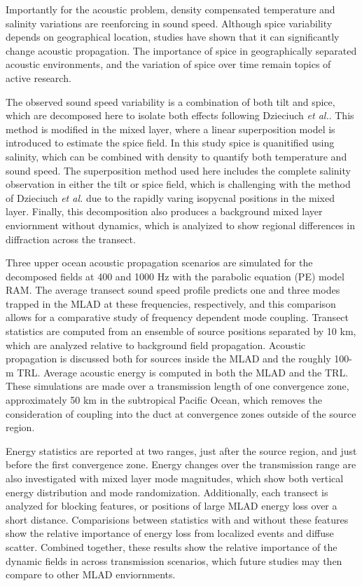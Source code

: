 \documentclass[preprint,NumberedRefs]{JASA}
\begin{document}
Importantly for the acoustic problem, density compensated temperature and salinity variations are reenforcing in sound speed. Although spice variability depends on geographical location, studies have shown that it can significantly change acoustic propagation\citep{colosi12,colosi13,murat2021}. The importance of spice in geographically separated acoustic environments, and the variation of spice over time remain topics of active research.

The observed sound speed variability is a combination of both tilt and spice, which are decomposed here to isolate both effects following Dzieciuch \emph{et al.}\citep{dzieciuch2004}. This method is modified in the mixed layer, where a linear superposition model is introduced to estimate the spice field. In this study spice is quanitified using salinity, which can be combined with density to quantify both temperature and sound speed. The superposition method used here includes the complete salinity observation in either the tilt or spice field, which is challenging with the method of Dzieciuch \emph{et al.}\cite{dzieciuch2004} due to the rapidly varing isopycnal positions in the mixed layer. Finally, this decomposition also produces a background mixed layer enviornment without dynamics, which is analyized to show regional differences in diffraction across the transect.

Three upper ocean acoustic propagation scenarios are simulated for the decomposed fields at 400 and 1000 Hz with the parabolic equation (PE) model RAM\cite{collins93}. The average transect sound speed profile predicts one and three modes trapped in the MLAD at these frequencies, respectively, and this comparison allows for a comparative study of frequency dependent mode coupling. Transect statistics are computed from an ensemble of source positions separated by 10 km, which are analyzed relative to background field propagation. Acoustic propagation is discussed both for sources inside the MLAD and the roughly 100-m TRL. Average acoustic energy is computed in both the MLAD and the TRL. These simulations are made over a transmission length of one convergence zone\citep{jensen2011computational}, approximately 50 km in the subtropical Pacific Ocean, which removes the consideration of coupling into the duct at convergence zones outside of the source region\citep{colosi2020observations}.

Energy statistics are reported at two ranges, just after the source region, and just before the first convergence zone. Energy changes over the transmission range are also investigated with mixed layer mode magnitudes, which show both vertical energy distribution and mode randomization. Additionally, each transect is analyzed for blocking features\citep{colosi2020observations}, or positions of large MLAD energy loss over a short distance. Comparisions between statistics with and without these features show the relative importance of energy loss from localized events and diffuse scatter. Combined together, these results show the relative importance of the dynamic fields in across transmission scenarios, which future studies may then compare to other MLAD enviornments.
\end{document}
